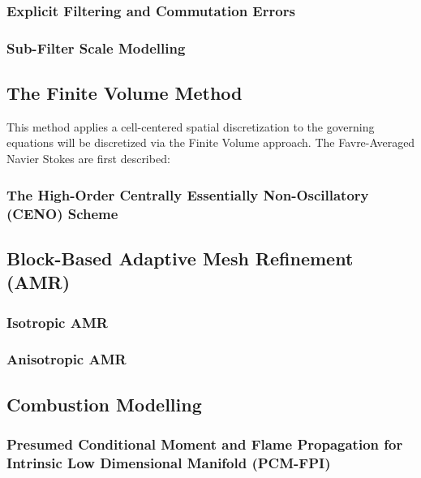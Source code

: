 \documentclass[titlepage,11pt,letterpaper]{article}
\begin{document}
\subsubsection{Explicit Filtering and Commutation Errors}
\subsubsection{Sub-Filter Scale Modelling}

\subsection{The Finite Volume Method}
This method applies a cell-centered spatial discretization to the governing equations will be discretized via the Finite Volume approach. The Favre-Averaged Navier Stokes are first described:\par
\subsubsection{The High-Order Centrally Essentially Non-Oscillatory (CENO) Scheme}

\subsection{Block-Based Adaptive Mesh Refinement (AMR)}
\subsubsection{Isotropic AMR}
\subsubsection{Anisotropic AMR}

\subsection{Combustion Modelling}
\subsubsection{Presumed Conditional Moment and Flame Propagation for Intrinsic Low Dimensional Manifold (PCM-FPI)}

\newpage
\end{document}
